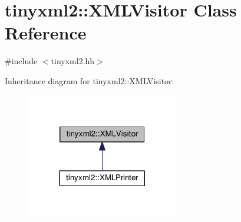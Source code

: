 \hypertarget{classtinyxml2_1_1XMLVisitor}{}\section{tinyxml2\+:\+:X\+M\+L\+Visitor Class Reference}
\label{classtinyxml2_1_1XMLVisitor}


{\ttfamily \#include $<$tinyxml2.\+hh$>$}



Inheritance diagram for tinyxml2\+:\+:X\+M\+L\+Visitor\+:
\nopagebreak
\begin{figure}[H]
\begin{center}
\leavevmode
\includegraphics[width=188pt]{classtinyxml2_1_1XMLVisitor__inherit__graph}
\end{center}
\end{figure}
